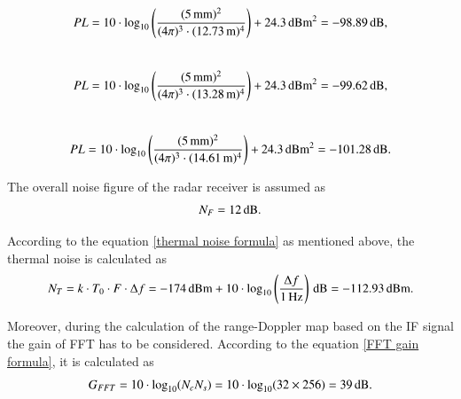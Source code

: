 \documentclass[12pt,DIV14,BCOR12mm,a4paper,footinclude=false,headinclude,parskip=half-,twoside,openright,cleardoublepage=empty,toc=index,bibliography=totoc,listof=totoc]{scrreprt}
\numberwithin{equation}{chapter}
\begin{document}
\begin{equation}
    \centering
    PL = 10\cdot\log_{10}\left(\frac{(5\,\mathrm{mm})^{2}}{(4\pi)^{3} \cdot (12.73\,\mathrm{m})^{4}}\right) + 24.3\,\mathrm{dBm^2} = -98.89\,\mathrm{dB},
\end{equation}\\
\begin{equation}
    \centering
    PL = 10\cdot\log_{10}\left(\frac{(5\,\mathrm{mm})^{2}}{(4\pi)^{3} \cdot (13.28\,\mathrm{m})^{4}}\right) + 24.3\,\mathrm{dBm^2} = -99.62\,\mathrm{dB},
\end{equation}\\
\begin{equation}
    \centering
    PL = 10\cdot\log_{10}\left(\frac{(5\,\mathrm{mm})^{2}}{(4\pi)^{3} \cdot (14.61\,\mathrm{m})^{4}}\right) + 24.3\,\mathrm{dBm^2} = -101.28\,\mathrm{dB}.
\end{equation}

The overall noise figure of the radar receiver is assumed as
\begin{equation}
    \centering
    N_{F} = 12\,\mathrm{dB}.
\end{equation}

According to the equation \ref{thermal noise formula} as mentioned above, the thermal noise is calculated as
\begin{equation}
    \centering
    N_{T} = k \cdot T_{0} \cdot F \cdot \Delta f = -174\,\mathrm{dBm} + 10\cdot\log_{10}\left(\frac{\Delta f}{1\,\mathrm{Hz}}\right)\,\mathrm{dB} = -112.93\,\mathrm{dBm}.
\end{equation}

Moreover, during the calculation of the range-Doppler map based on the IF signal the gain of FFT has to be considered. According to the equation \ref{FFT gain formula}, it is calculated as
\begin{equation}
    \centering
    G_{FFT} = 10\cdot\log_{10}(N_{c}N_{s}) = 10\cdot\log_{10}(32 \times 256) = 39\,\mathrm{dB}.
\end{equation}
\end{document}
